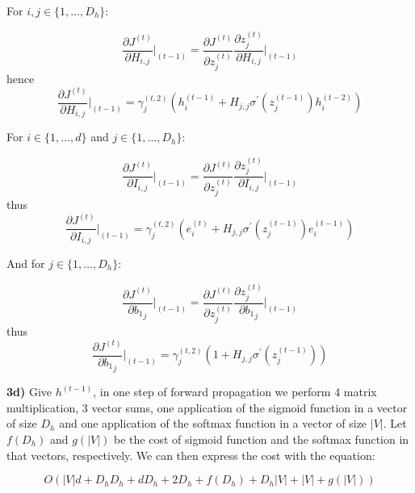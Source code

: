\documentclass{article}
\begin{document}
For $i,j \in \{1, \dots, D_{h}\}$:


\begin{equation}\label{eq:46}
\frac{\partial J^{(t)}}{\partial H_{i,j}}\vert_{(t-1)} =\frac{\partial J^{(t)}}{\partial z^{(t)}_{j}}\frac{\partial  z^{(t)}_{j}}{\partial H_{i,j}}\vert_{(t-1)}  
\end{equation}
hence
\begin{equation}\label{eq:47}
\frac{\partial J^{(t)}}{\partial H_{i,j}}\vert_{(t-1)} =  \gamma^{(t,2)}_{j}(h^{(t-1)}_{i} + H_{j,j}\sigma^{\prime}(z^{(t-1)}_{j})h^{(t-2)}_{i})
\end{equation}



For $i \in \{1, \dots, d\}$ and $j \in \{1, \dots, D_{h}\}$:

\begin{equation}\label{eq:48}
\frac{\partial J^{(t)}}{\partial I_{i,j}}\vert_{(t-1)} =\frac{\partial J^{(t)}}{\partial z^{(t)}_{j}}\frac{\partial  z^{(t)}_{j}}{\partial I_{i,j}}\vert_{(t-1)}  
\end{equation}
thus
\begin{equation}\label{eq:49}
\frac{\partial J^{(t)}}{\partial I_{i,j}}\vert_{(t-1)} = \gamma^{(t,2)}_{j}(e^{(t)}_{i} + H_{j,j}\sigma^{\prime}(z^{(t-1)}_{j})e^{(t-1)}_{i})
\end{equation}

And for $j \in \{1, \dots, D_{h}\}$:

\begin{equation}\label{eq:50}
\frac{\partial J^{(t)}}{\partial {b_1}_{j}}\vert_{(t-1)} =\frac{\partial J^{(t)}}{\partial z^{(t)}_{j}}\frac{\partial  z^{(t)}_{j}}{\partial {b_1}_{j}}\vert_{(t-1)}  
\end{equation}
thus
\begin{equation}\label{eq:51}
\frac{\partial J^{(t)}}{\partial {b_1}_{j}}\vert_{(t-1)} = \gamma^{(t,2)}_{j}(1 + H_{j,j}\sigma^{\prime}(z^{(t-1)}_{j}))
\end{equation}

\textbf{3d)}
Give $h^{(t-1)}$, in one step of forward propagation we perform 4 matrix multiplication, 3 vector sums, one application of the sigmoid function in a vector of size $D_h$ and one application of the softmax function in a vector of size $|V|$. Let $f(D_h)$ and $g(|V|)$ be the cost of sigmoid function and the softmax function in that vectors, respectively. We can then express the cost with the equation:   

\begin{equation}\label{eq:52}
O(|V|d +D_hD_h + dD_h + 2D_h + f(D_h) +D_h|V| + |V| + g(|V|))
\end{equation}
\end{document}
